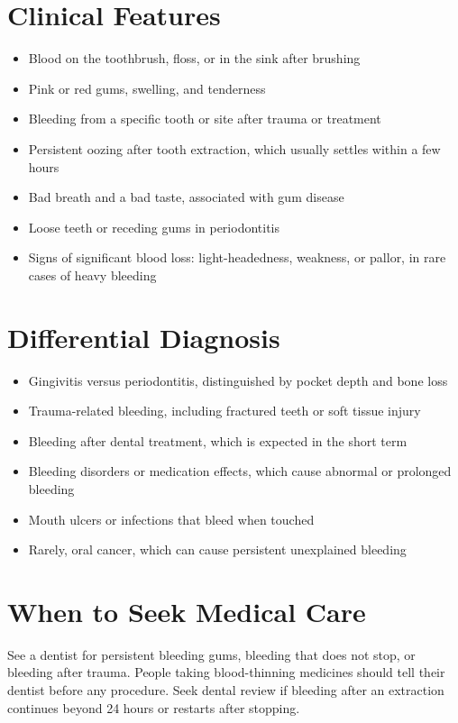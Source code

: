 \section*{Clinical Features}
\begin{itemize}
    \item Blood on the toothbrush, floss, or in the sink after brushing
    \item Pink or red gums, swelling, and tenderness
    \item Bleeding from a specific tooth or site after trauma or treatment
    \item Persistent oozing after tooth extraction, which usually settles within a few hours
    \item Bad breath and a bad taste, associated with gum disease
    \item Loose teeth or receding gums in periodontitis
    \item Signs of significant blood loss: light-headedness, weakness, or pallor, in rare cases of heavy bleeding
\end{itemize}

\section*{Differential Diagnosis}
\begin{itemize}
    \item Gingivitis versus periodontitis, distinguished by pocket depth and bone loss
    \item Trauma-related bleeding, including fractured teeth or soft tissue injury
    \item Bleeding after dental treatment, which is expected in the short term
    \item Bleeding disorders or medication effects, which cause abnormal or prolonged bleeding
    \item Mouth ulcers or infections that bleed when touched
    \item Rarely, oral cancer, which can cause persistent unexplained bleeding
\end{itemize}

\section*{When to Seek Medical Care}
See a dentist for persistent bleeding gums, bleeding that does not stop, or bleeding after trauma. People taking blood-thinning medicines should tell their dentist before any procedure. Seek dental review if bleeding after an extraction continues beyond 24 hours or restarts after stopping.


